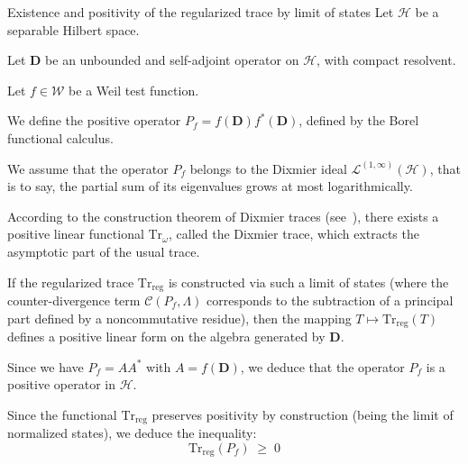 \documentclass[Riemann_Hypothesis.tex]{subfiles}
\begin{document}
\begin{lemmaEn}[label=lm:PositiviteTraceRegularisee]{Existence and positivity of the regularized trace by limit of states}
    Let $\mathcal{H}$ be a separable Hilbert space. \par
    Let $\mathbf{D}$ be an unbounded and self-adjoint operator on $\mathcal{H}$, with compact resolvent. \par
    Let $f \in \mathcal{W}$ be a Weil test function. \par
    We define the positive operator $P_f = f(\mathbf{D}) f^*(\mathbf{D})$, defined by the Borel functional calculus. \par
    We assume that the operator $P_f$ belongs to the Dixmier ideal $\mathcal{L}^{(1, \infty)}(\mathcal{H})$, that is to say, the partial sum of its eigenvalues grows at most logarithmically. \par
    According to the construction theorem of Dixmier traces 
    (see~\cite{connes1994_noncommutative_en}), 
    there exists a positive linear functional $\mathrm{Tr}_{\omega}$, called the Dixmier trace, which extracts the asymptotic part of the usual trace. \par
    If the regularized trace $\mathrm{Tr}_{\mathrm{reg}}$ is constructed via such a limit of states (where the counter-divergence term 
    $\mathcal{C}(P_f, \Lambda)$ corresponds to the subtraction of a principal part defined by a 
    noncommutative residue), then the mapping $T \mapsto \mathrm{Tr}_{\mathrm{reg}}(T)$ defines a 
    positive linear form on the algebra generated by $\mathbf{D}$. \par
    Since we have $P_f = A A^*$ with $A = f(\mathbf{D})$, we deduce that the operator $P_f$ is a 
    positive operator in $\mathcal{H}$. \par
    Since the functional $\mathrm{Tr}_{\mathrm{reg}}$ preserves positivity by construction 
    (being the limit of normalized states), we deduce the inequality:
    \begin{equation*}
        \mathrm{Tr}_{\mathrm{reg}}(P_f) \;\geq\; 0
    \end{equation*}
\end{lemmaEn}
\end{document}
